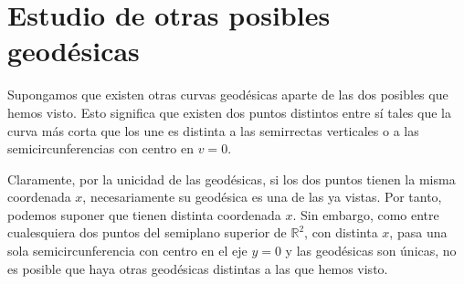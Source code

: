 \section{Estudio de otras posibles geodésicas}
Supongamos que existen otras curvas geodésicas aparte de las dos posibles que
hemos visto. Esto significa que existen dos puntos distintos entre sí tales que
la curva más corta que los une es distinta a las semirrectas verticales o  a las
semicircunferencias con centro en $v = 0$.

Claramente, por la unicidad de las geodésicas, si los dos puntos tienen la misma
coordenada $x$, necesariamente su geodésica es una de las ya vistas. Por tanto,
podemos suponer que tienen distinta coordenada $x$. Sin embargo, como entre
cualesquiera dos puntos del semiplano superior de $\mathbb{R}^2$, con distinta
$x$, pasa una sola semicircunferencia con centro en el eje $y = 0$ y las
geodésicas son únicas, no es posible que haya otras geodésicas distintas a las
que hemos visto.
